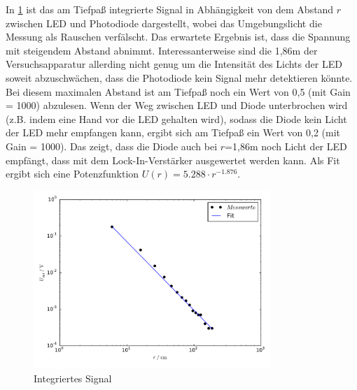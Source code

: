 In \ref{fig:plot4} ist das am Tiefpaß integrierte Signal in Abhängigkeit von
dem Abstand $r$ zwischen LED und Photodiode dargestellt, wobei das Umgebungslicht
die Messung als Rauschen verfälscht. Das erwartete Ergebnis
ist, dass die Spannung mit steigendem Abstand abnimmt. Interessanterweise
sind die 1,86m der Versuchsapparatur allerding nicht genug um die Intensität
des Lichts der LED soweit abzuschwächen, dass die Photodiode kein Signal
mehr detektieren könnte. Bei diesem maximalen Abstand ist am Tiefpaß noch ein
Wert von 0,5 (mit Gain = 1000) abzulesen. Wenn der Weg zwischen LED und
Diode unterbrochen wird (z.B. indem eine Hand vor die LED gehalten wird),
sodass die Diode kein Licht der LED mehr empfangen kann, ergibt sich am
Tiefpaß ein Wert von 0,2 (mit Gain = 1000). Das zeigt, dass die Diode auch
bei $r$=1,86m noch Licht der LED empfängt, dass mit dem Lock-In-Verstärker
ausgewertet werden kann. Als Fit ergibt sich eine Potenzfunktion
$U(r) = 5.288 \cdot r^{-1.876}$.
\begin{figure}[H]
  \centering
  \includegraphics[width=0.8\textwidth, height=0.5\textwidth]{plot4.pdf}
  \caption{Integriertes Signal}
  \label{fig:plot4}
\end{figure}
